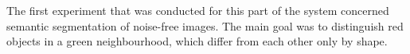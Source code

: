 The first experiment that was conducted for this part of the system concerned semantic segmentation of noise-free images. The main goal was to distinguish red objects in a green neighbourhood, which differ from each other only by shape.